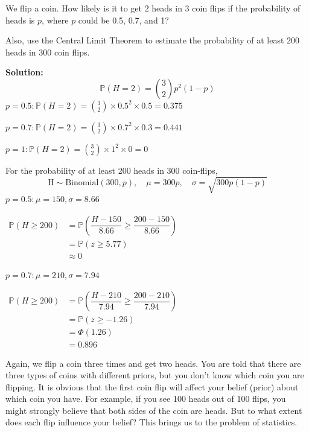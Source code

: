\begin{eg}
  We flip a coin. How likely is it to get 2 heads in 3 coin flips if the probability of heads is \(p\), where \(p\) could be 0.5, 0.7, and 1? 
  
  Also, use the Central Limit Theorem to estimate the probability of at least 200 heads in 300 coin flips.

  \textbf{Solution:} 
  \[
    \mathbb{P}(H = 2) = \binom{3}{2} p^2(1 - p)
  \]
  \(p = 0.5: \mathbb{P}(H = 2) = \binom{3}{2} \times 0.5^2 \times 0.5 = 0.375\)

  \(p = 0.7: \mathbb{P}(H = 2) = \binom{3}{2} \times 0.7^2 \times 0.3 = 0.441\)

  \(p = 1: \mathbb{P}(H = 2) = \binom{3}{2} \times 1^2 \times 0 = 0\)

  For the probability of at least 200 heads in 300 coin-flips, 
  \[
    \text{H} \sim \text{Binomial}(300, p),\quad \mu = 300p,\quad \sigma = \sqrt{300p(1 - p)}
  \]
  \(p = 0.5: \mu = 150, \sigma = 8.66\)

  \(
  \begin{aligned}
    \mathbb{P}(H \geq 200) &= \mathbb{P}(\dfrac{H - 150}{8.66} \geq \dfrac{200 - 150}{8.66}) \\
    &= \mathbb{P}(z \geq 5.77) \\
    &\approx 0
  \end{aligned}
  \) 

  \(p = 0.7: \mu = 210, \sigma = 7.94\)

  \(
  \begin{aligned}
    \mathbb{P}(H \geq 200) &= \mathbb{P}(\dfrac{H - 210}{7.94} \geq \dfrac{200 - 210}{7.94}) \\
    &= \mathbb{P}(z \geq -1.26) \\
    &= \varPhi (1.26) \\
    &= 0.896
  \end{aligned}
  \) 
  
\end{eg}

Again, we flip a coin three times and get two heads. You are told that there are three types of coins with different priors, but you don’t know which coin you are flipping. It is obvious that the first coin flip will affect your belief (prior) about which coin you have. For example, if you see 100 heads out of 100 flips, you might strongly believe that both sides of the coin are heads. But to what extent does each flip influence your belief? This brings us to the problem of statistics.

